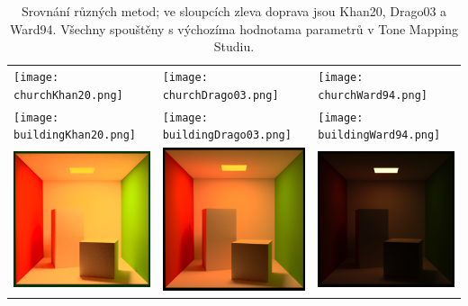 \documentclass[11pt,a4paper,oneside]{article}
\begin{document}


\begin{table}[htb]
    \centering
    \caption{Srovnání různých metod; ve sloupcích zleva doprava jsou Khan20,
    Drago03 a Ward94. Všechny spouštěny s výchozíma hodnotama parametrů v Tone Mapping
    Studiu.}
    \label{tab:method-comp}
    \begin{tabular}{lll}
        \texttt{[image: churchKhan20.png]} &
        \texttt{[image: churchDrago03.png]} &
        \texttt{[image: churchWard94.png]} \\
    \texttt{[image: buildingKhan20.png]} &
        \texttt{[image: buildingDrago03.png]} &
        \texttt{[image: buildingWard94.png]}\\
    \includegraphics[width=.33\linewidth,valign=m]{cornell_boxKhan20.png} &
        \includegraphics[width=.33\linewidth,valign=m]{cornell_boxDrago03.png} &
        \includegraphics[width=.33\linewidth,valign=m]{cornell_boxWard94.png}\\
    \end{tabular}
\end{table}
\end{document}

